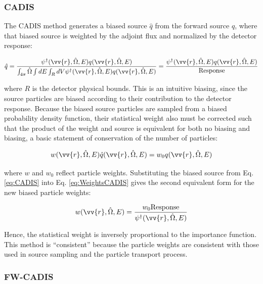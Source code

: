 \documentclass[10pt]{article}
\begin{document}
\begin{flushleft}
\subsubsection{CADIS}

The CADIS method generates a biased source \(\hat{q}\) from the forward source \(q\), where that biased source is weighted by the adjoint flux and normalized by the detector response:

\begin{equation}
\label{eq:CADIS}
\begin{aligned}
\hat{q}= \frac{\psi^\dagger(\vv{r},\hat{\Omega},E)q(\vv{r},\hat{\Omega},E)}{\int_{4\pi}\hat{\Omega}\int dE\int_RdV\psi^\dagger(\vv{r},\hat{\Omega},E)q(\vv{r},\hat{\Omega},E)}= \frac{\psi^\dagger(\vv{r},\hat{\Omega},E)q(\vv{r},\hat{\Omega},E)}{\textrm{Response}}\\
\end{aligned}
\end{equation}

where \(R\) is the detector physical bounds. This is an intuitive biasing, since the source particles are biased according to their contribution to the detector response. Because the biased source particles are sampled from a biased probability density function, their statistical weight also must be corrected such that the product of the weight and source is equivalent for both no biasing and biasing, a basic statement of conservation of the number of particles:

\begin{equation}
\label{eq:WeightsCADIS}
w(\vv{r},\hat{\Omega},E)\hat{q}(\vv{r},\hat{\Omega},E)=w_0q(\vv{r},\hat{\Omega},E)
\end{equation}

where \(w\) and \(w_0\) reflect particle weights. Substituting the biased source from Eq. \eqref{eq:CADIS} into Eq. \eqref{eq:WeightsCADIS} gives the second equivalent form for the new biased particle weights:

\begin{equation}
\label{eq:WeightsCADIS2}
w(\vv{r},\hat{\Omega},E)=\frac{w_0\textrm{Response}}{\psi^\dagger(\vv{r},\hat{\Omega},E)}
\end{equation}

Hence, the statistical weight is inversely proportional to the importance function. This method is ``consistent'' because the particle weights are consistent with those used in source sampling and the particle transport process.

\subsubsection{FW-CADIS}


\end{flushleft}
\end{document}
